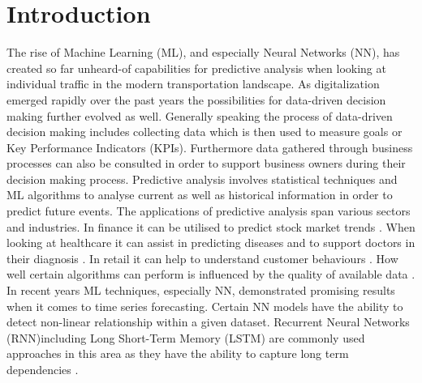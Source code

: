 %
%
% 
% 
% 

\chapter{Introduction}
\label{chap:introduction}
The rise of Machine Learning (ML), and especially Neural Networks (NN), has created so far unheard-of capabilities for predictive analysis when looking at individual traffic in the modern transportation landscape. As digitalization emerged rapidly over the past years the possibilities for data-driven decision making further evolved as well. Generally speaking the process of data-driven decision making includes collecting data which is then used to measure goals or Key Performance Indicators (KPIs). Furthermore data gathered through business processes can also be consulted in order to support business owners during their decision making process.
\newline
\newline 
Predictive analysis involves statistical techniques and ML algorithms to analyse current as well as historical information in order to predict future events. The applications of predictive analysis span various sectors and industries. In finance it can be utilised to predict stock market trends \cite{stock_market}. When looking at healthcare it can assist in predicting diseases and to support doctors in their diagnosis \cite{health_care}. In retail it can help to understand customer behaviours \cite{retail}. How well certain algorithms can perform is influenced by the quality of available data \cite{data_qual}. In recent years ML techniques, especially NN, demonstrated promising results when it comes to time series forecasting. Certain NN models have the ability to detect non-linear relationship within a given dataset. Recurrent Neural Networks (RNN)including Long Short-Term Memory (LSTM) are commonly used approaches in this area as they have the ability to capture long term dependencies \cite{intro_ml_1}.
\newline
\newline
